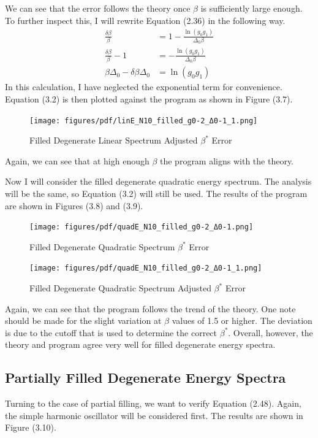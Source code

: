 We can see that the error follows the theory once $\beta$ is sufficiently large enough. To further inspect this, I will rewrite Equation (2.36) in the following way. 
\begin{align}
    \frac{\delta\beta}{\beta}&=1-\frac{\ln(g_0g_1)}{\Delta_0\beta}\nonumber\\
    \frac{\delta\beta}{\beta}-1&=-\frac{\ln(g_0g_1)}{\Delta_0\beta}\nonumber\\
    \beta\Delta_0-\delta\beta\Delta_0&=\ln(g_0g_1)
\end{align}
In this calculation, I have neglected the exponential term for convenience. Equation (3.2) is then plotted against the program as shown in Figure (3.7). 
\begin{figure}[H]
    \centering
    \texttt{[image: figures/pdf/linE\_N10\_filled\_g0-2\_Δ0-1\_1.png]}
    \caption{Filled Degenerate Linear Spectrum Adjusted $\beta^*$ Error}
    \label{fig:FilledDegenerateLinearSpectrumAdjustedError}
\end{figure}
Again, we can see that at high enough $\beta$ the program aligns with the theory. 

Now I will consider the filled degenerate quadratic energy spectrum. The analysis will be the same, so Equation (3.2) will still be used. The results of the program are shown in Figures (3.8) and (3.9). 

\begin{figure}[H]
    \centering
    \texttt{[image: figures/pdf/quadE\_N10\_filled\_g0-2\_Δ0-1.png]}
    \caption{Filled Degenerate Quadratic Spectrum $\beta^*$ Error}
    \label{fig:FilledDegenerate}
\end{figure}

\begin{figure}[H]
    \centering
    \texttt{[image: figures/pdf/quadE\_N10\_filled\_g0-2\_Δ0-1\_1.png]}
    \caption{Filled Degenerate Quadratic Spectrum Adjusted $\beta^*$ Error}
    \label{fig:FilledDegenerate2}
\end{figure}

Again, we can see that the program follows the trend of the theory. One note should be made for the slight variation at $\beta$ values of 1.5 or higher. The deviation is due to the cutoff that is used to determine the correct $\beta^*$. Overall, however, the theory and program agree very well for filled degenerate energy spectra.

\subsection{Partially Filled Degenerate Energy Spectra}
Turning to the case of partial filling, we want to verify Equation (2.48). Again, the simple harmonic oscillator will be considered first. The results are shown in Figure (3.10). 


